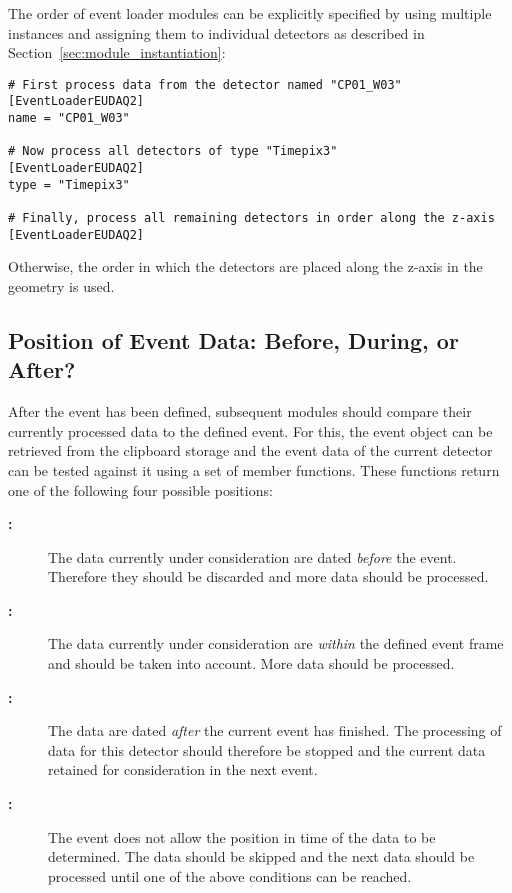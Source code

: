 The order of event loader modules can be explicitly specified by using multiple instances and assigning them to individual detectors as described in Section~\ref{sec:module_instantiation}:

\begin{verbatim}
# First process data from the detector named "CP01_W03"
[EventLoaderEUDAQ2]
name = "CP01_W03"

# Now process all detectors of type "Timepix3"
[EventLoaderEUDAQ2]
type = "Timepix3"

# Finally, process all remaining detectors in order along the z-axis
[EventLoaderEUDAQ2]
\end{verbatim}

Otherwise, the order in which the detectors are placed along the z-axis in the geometry is used.

\subsection{Position of Event Data: Before, During, or After?}

After the event has been defined, subsequent modules should compare their currently processed data to the defined event.
For this, the event object can be retrieved from the clipboard storage and the event data of the current detector can be tested against it using a set of member functions.
These functions return one of the following four possible positions:
\begin{description}
        \item[\textbf{:}] The data currently under consideration are dated \emph{before} the event. Therefore they should be discarded and more data should be processed.
        \item[\textbf{:}] The data currently under consideration are \emph{within} the defined event frame and should be taken into account. More data should be processed.
        \item[\textbf{:}] The data are dated \emph{after} the current event has finished. The processing of data for this detector should therefore be stopped and the current data retained for consideration in the next event.
        \item[\textbf{:}] The event does not allow the position in time of the data to be determined. The data should be skipped and the next data should be processed until one of the above conditions can be reached.
\end{description}


